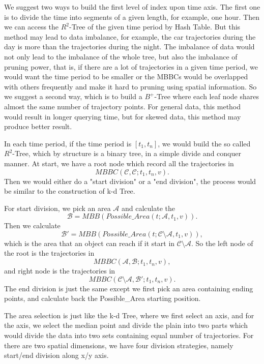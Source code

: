 \documentclass[sigplan]{acmart}
\begin{document}
We suggest two ways to build the first level of index upon time axis. The first one is to divide the time into segments of a given length, for example, one hour. Then we can access the $R^2$-Tree of the given time period by Hash Table. But this method may lead to data imbalance, for example, the car trajectories during the day is more than the trajectories during the night. The imbalance of data would not only lead to the imbalance of the whole tree, but also the imbalance of pruning power, that is, if there are a lot of trajectories in a given time period, we would want the time period to be smaller or the MBBCs would be overlapped with others frequently and make it hard to pruning using spatial information. So we suggest a second way, which is to build a $B^+$-Tree where each leaf node shares almost the same number of trajectory points. For general data, this method would result in longer querying time, but for skewed data, this method may produce better result.\par

In each time period, if the time period is $[t_1,t_n]$, we would build the so called $R^2$-Tree, which by structure is a binary tree, in a simple divide and conquer manner. At start, we have a root node which record all the trajectories in $$MBBC(\mathcal{C},\mathcal{C};t_1,t_n,v).$$ Then we would either do a "start division" or a "end division", the process would be similar to the construction of k-d Tree.\par

For start division, we pick an area $\mathcal{A}$ and calculate the $$\mathcal{B}=MBB(Possible\_Area(t;\mathcal{A},t_1,v)).$$
Then we calculate $$\mathcal{B'}=MBB(Possible\_Area(t;\mathcal{C} \setminus \mathcal{A},t_1,v)),$$
which is the area that an object can reach if it start in $\mathcal{C}\setminus \mathcal{A}$. So the left node of the root is the trajectories in $$MBBC(\mathcal{A},\mathcal{B};t_1,t_n,v),$$ and right node is the trajectories in $$MBBC(\mathcal{C}\setminus \mathcal{A},\mathcal{B'};t_1,t_n,v).$$ The end division is just the same except we first pick an area containing ending points, and calculate back the Possible\_Area starting position.\par

The area selection is just like the k-d Tree, where we first select an axis, and for the axis, we select the median point and divide the plain into two parts which would divide the data into two sets containing equal number of trajectories. For there are two spatial dimensions, we have four division strategies, namely start/end division along x/y axis.\par
\end{document}
